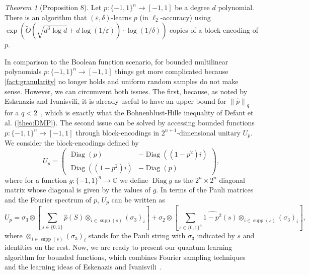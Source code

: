 \documentclass[11pt]{article}
\newcommand{\norm}[1]{\left\|{#1}\right\|}
\newcommand{\eps}{\varepsilon}
\theoremstyle{plain}
\DeclareMathOperator{\Diag}{Diag}
\DeclareMathOperator{\supp}{supp}
\theoremstyle{plain}
\theoremstyle{definition}
\theoremstyle{remark}
\theoremstyle{named}
\newtheorem*{namedtheorem}{Theorem}
\begin{document}
\begin{namedtheorem}[Proposition 8]
    Let $p:\{-1,1\}^n\to [-1,1]$ be a degree $d$ polynomial. There is an algorithm that $(\varepsilon,\delta)$-learns $p$ (in $\ell_2$-accuracy) using $
    \exp(\widetilde{O}(\sqrt{d^{3}\log d}+d\log(1/\eps))\cdot \log (1/\delta))$ copies of a block-encoding of $p$.
\end{namedtheorem}
In comparison to the Boolean function scenario, for bounded multilinear polynomials $p:\{-1,1\}^n\to [-1,1]$ things get more complicated because \cref{fact:granularity} no longer holds and uniform random samples do not make sense. However, we can circumvent both issues. The first, because, as noted by Eskenazis and Ivanisvili, it is already useful to have an upper bound for $\norm{\widehat p}_q$ for a $q<2$~\cite{eskenazis2022learning}, which is exactly what the Bohnenblust-Hille inequality of Defant et al. (\cref{theo:DMP}). The second issue can be solved by accessing bounded functions $p:
\{-1,1\}^n\to [-1,1]$ through block-encodings in $2^{n+1}$-dimensional unitary $U_p$. We consider the block-encodings defined by
\begin{equation}
\label{eq:blockenc}
    U_p=\begin{pmatrix} \Diag(p) & -\Diag((1-p^2)i)\\ \Diag((1-p^2)i)& -\Diag(p)\end{pmatrix},
\end{equation}
where for a function $g:\{-1,1\}^n\to \mathbb C$ we define $\Diag g$ as the $2^n\times 2^n$ diagonal matrix whose diagonal is given by the values of $g$. In terms of the Pauli matrices and the Fourier spectrum of $p$, $U_p$ can be written as 
\begin{equation}
\label{eq:blockencpau}
    U_p= \sigma_3\otimes \left[\sum_{s\in \{0,1\}}\widehat p(S) \otimes_{i\in \supp (s)}(\sigma_3)_i\right]+\sigma_2\otimes \left[\sum_{s\in\{0,1\}^n}\widehat{1-p^2}(s) \otimes_{i\in \supp(s)}(\sigma_3)_i\right],
\end{equation}
where $\otimes_{i\in \supp (s)}(\sigma_3)_i$ stands for the Pauli string with $\sigma_3$ indicated by $s$ and identities on the rest.  Now, we are ready to present our quantum learning algorithm for bounded functions, which combines Fourier sampling techniques and the learning ideas of Eskenazis and Ivanisvili~\cite{eskenazis2022learning}. 
\end{document}
